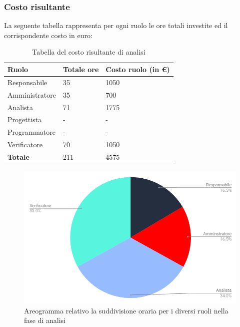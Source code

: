 \subsubsection{Costo risultante}
La seguente tabella rappresenta per ogni ruolo le ore totali investite ed il corrispondente costo in euro:
{
\renewcommand{\arraystretch}{2}
\begin{longtable}{ C{3cm} C{2cm} C{4cm}}
\caption{Tabella del costo risultante di analisi}\\
\rowcolor{\primaryColor}

\textcolor{\secondaryColor}{\textbf{Ruolo}} & 
\textcolor{\secondaryColor}{\textbf{Totale ore}} & 
\textcolor{\secondaryColor}{\textbf{Costo ruolo (in \euro{})}}\\	
\endhead

Responsabile    &  35 &  1050 \\
Amministratore  &  35 &  700 \\
Analista        &  71 & 1775 \\
Progettista     &   - &  - \\
Programmatore   &   - &  - \\
Verificatore    &  70 & 1050 \\
\textbf{Totale} & 211 & 4575 \\
		
\end{longtable}
}

\begin{figure}[h!]
	\caption{Areogramma relativo la suddivisione oraria per i diversi ruoli nella fase di analisi}
    \includegraphics[width=1\textwidth]{./src/Preventivo/src/img/TortaAnalisi.png}    
\end{figure}


